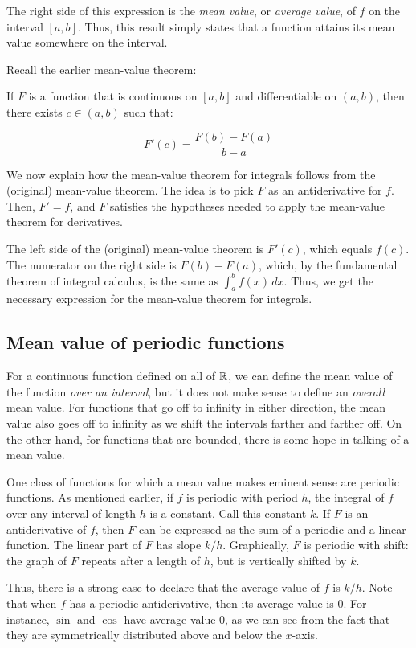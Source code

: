 \documentclass{amsart}
\begin{document}
The right side of this expression is the {\em mean value}, or {\em
average value}, of $f$ on the interval $[a,b]$. Thus, this result
simply states that a function attains its mean value somewhere on the
interval.

Recall the earlier mean-value theorem:

If $F$ is a function that is continuous on $[a,b]$ and differentiable
on $(a,b)$, then there exists $c \in (a,b)$ such that:

$$F'(c) = \frac{F(b) - F(a)}{b - a}$$

We now explain how the mean-value theorem for integrals follows from
the (original) mean-value theorem. The idea is to pick $F$ as an
antiderivative for $f$. Then, $F' = f$, and $F$ satisfies the
hypotheses needed to apply the mean-value theorem for derivatives.

The left side of the (original) mean-value theorem is $F'(c)$, which
equals $f(c)$. The numerator on the right side is $F(b) - F(a)$,
which, by the fundamental theorem of integral calculus, is the same as
$\int_a^b f(x) \, dx$. Thus, we get the necessary expression for the
mean-value theorem for integrals.

\subsection{Mean value of periodic functions}

For a continuous function defined on all of $\mathbb{R}$, we can define the
mean value of the function {\em over an interval}, but it does not
make sense to define an {\em overall} mean value. For functions that
go off to infinity in either direction, the mean value also goes off
to infinity as we shift the intervals farther and farther off. On the
other hand, for functions that are bounded, there is some hope in
talking of a mean value.

One class of functions for which a mean value makes eminent sense are
periodic functions. As mentioned earlier, if $f$ is periodic with
period $h$, the integral of $f$ over any interval of length $h$ is a
constant. Call this constant $k$. If $F$ is an antiderivative of $f$,
then $F$ can be expressed as the sum of a periodic and a linear
function. The linear part of $F$ has slope $k/h$. Graphically, $F$ is
periodic with shift: the graph of $F$ repeats after a length of $h$,
but is vertically shifted by $k$.

Thus, there is a strong case to declare that the average value of $f$
is $k/h$. Note that when $f$ has a periodic antiderivative, then its
average value is $0$. For instance, $\sin$ and $\cos$ have average
value $0$, as we can see from the fact that they are symmetrically
distributed above and below the $x$-axis. 
\end{document}
